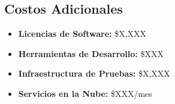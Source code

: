 \subsection{Costos Adicionales}
\begin{itemize}
    \item \textbf{Licencias de Software:} \$X,XXX
    \item \textbf{Herramientas de Desarrollo:} \$XXX
    \item \textbf{Infraestructura de Pruebas:} \$X,XXX
    \item \textbf{Servicios en la Nube:} \$XXX/mes
\end{itemize}